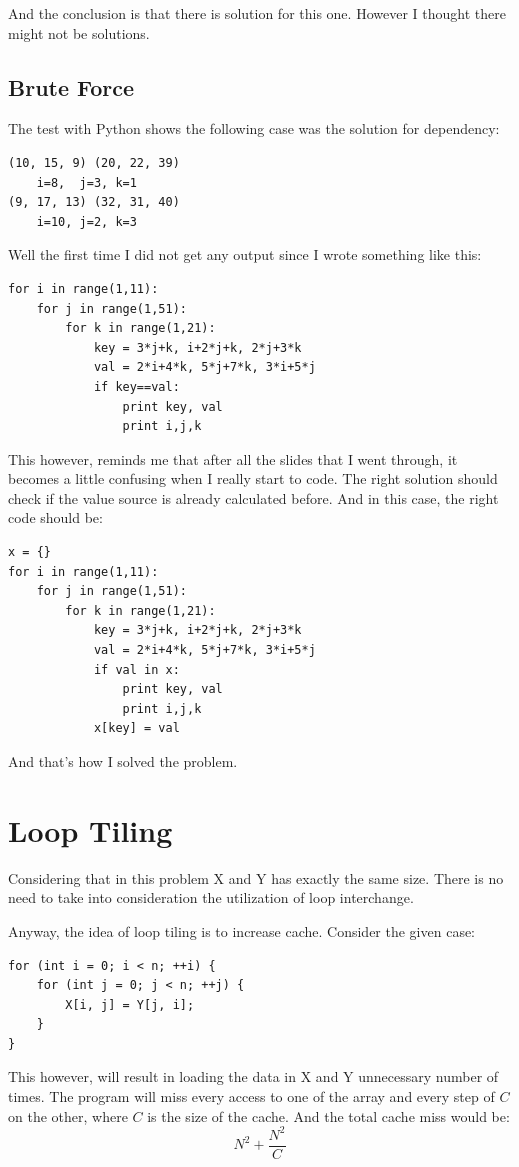 \documentclass[12pt]{article}
\begin{document}
And the conclusion is that there is solution for this one. However I
thought there might not be solutions. 

\subsection{Brute Force}
The test with Python shows the following case was the solution for
dependency:
\begin{verbatim}
(10, 15, 9) (20, 22, 39)
    i=8,  j=3, k=1
(9, 17, 13) (32, 31, 40)
    i=10, j=2, k=3
\end{verbatim}

Well the first time I did not get any output since I wrote something
like this:

\begin{verbatim}
for i in range(1,11):
    for j in range(1,51):
        for k in range(1,21):
            key = 3*j+k, i+2*j+k, 2*j+3*k
            val = 2*i+4*k, 5*j+7*k, 3*i+5*j
            if key==val:
                print key, val
                print i,j,k
\end{verbatim}

This however, reminds me that after all the slides that I went
through, it becomes a little confusing when I really start to
code. The right solution should check if the value source is already
calculated before. And in this case, the right code should be:

\begin{verbatim}
x = {}
for i in range(1,11):
    for j in range(1,51):
        for k in range(1,21):
            key = 3*j+k, i+2*j+k, 2*j+3*k
            val = 2*i+4*k, 5*j+7*k, 3*i+5*j
            if val in x:
                print key, val
                print i,j,k
            x[key] = val
\end{verbatim}
And that's how I solved the problem.
\section{Loop Tiling}

Considering that in this problem X and Y has exactly the same size. There is no need to take into consideration
the utilization of loop interchange.

Anyway, the idea of loop tiling is to increase cache. 
Consider the given case:
\begin{verbatim}
for (int i = 0; i < n; ++i) {
    for (int j = 0; j < n; ++j) {
        X[i, j] = Y[j, i];
    }
}

\end{verbatim}
This however, will result in loading the data in X and Y 
unnecessary number of times. The program will miss every access to one
of the array and every step of $C$ on the other, where $C$ is the size
of the cache. And the total cache miss would be: $$N^2+\frac{N^2}{C}$$
\end{document}

